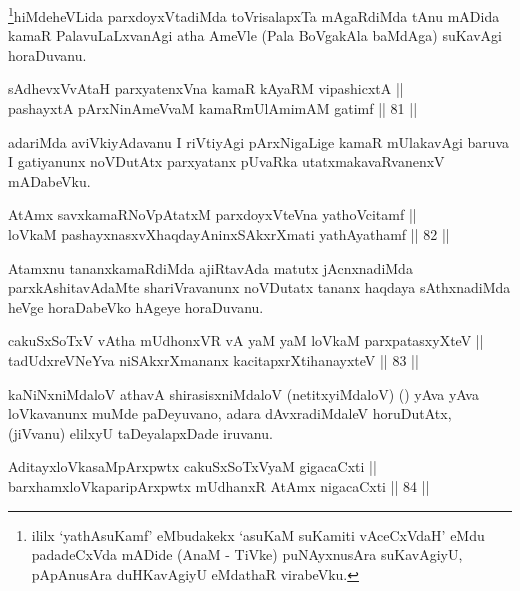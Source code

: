 \begin{artha}
\footnote{ililx `yathAsuKamf' eMbudakekx `asuKaM suKamiti vAceCxVdaH'
eMdu padadeCxVda mADide (AnaM - TiVke) puNAyxnusAra suKavAgiyU,
pApAnusAra duHKavAgiyU eMdathaR virabeVku.}hiMdeheVLida parxdoyxVtadiMda toVrisalapxTa mAgaRdiMda tAnu
mADida kamaR PalavuLaLxvanAgi atha AmeVle (Pala BoVgakAla baMdAga)
suKavAgi horaDuvanu.
\end{artha}

\begin{shl}
sAdhevxVvAtaH parxyatenxVna kamaR kAyaRM vipashicxtA || \\
pashayxtA pArxNinAmeVvaM kamaRmUlAmimAM gatimf \hfill || 81 ||  
\end{shl}

\begin{artha}
adariMda aviVkiyAdavanu I riVtiyAgi pArxNigaLige kamaR mUlakavAgi
baruva I gatiyanunx noVDutAtx parxyatanx pUvaRka utatxmakavaRvanenxV
mADabeVku.
\end{artha}

\begin{shl}
AtAmx savxkamaRNoVpAtatxM parxdoyxVteVna yathoVcitamf || \\
loVkaM pashayxnasxvXhaqdayAninxSAkxrXmati yathAyathamf \hfill || 82 ||  
\end{shl}

\begin{artha}
Atamxnu tananxkamaRdiMda ajiRtavAda matutx jAcnxnadiMda
parxkAshitavAdaMte shariVravanunx noVDutatx tananx haqdaya
sAthxnadiMda heVge horaDabeVko hAgeye horaDuvanu.
\end{artha}


\begin{shl}
cakuSxSoTxV vA\s tha mUdhonxVR vA yaM yaM loVkaM parxpatasxyXteV || \\
tadUdxreVNeYva niSAkxrXmananx kacitapxrXtihanayxteV \hfill || 83 ||  
\end{shl}

\begin{artha}
kaNiNxniMdaloV athavA shirasisxniMdaloV (netitxyiMdaloV) (\quad) yAva
yAva loVkavanunx muMde paDeyuvano, adara dAvxradiMdaleV horuDutAtx,
(jiVvanu) elilxyU taDeyalapxDade iruvanu.
\end{artha}

\begin{shl}
AditayxloVka\footnotemark[1]saMpArxpwtx cakuSxSoTxV\s yaM gigacaCxti || \\
barxhamxloVka\footnotemark[2]paripArxpwtx mUdhanxR AtAmx nigacaCxti \hfill || 84 ||  
\end{shl}

